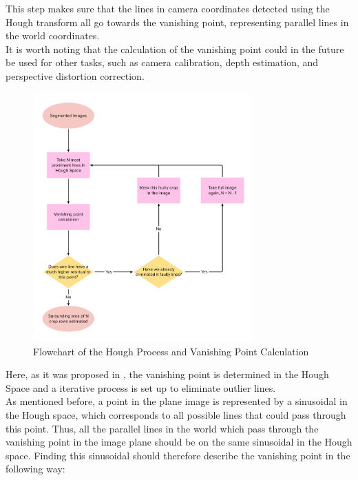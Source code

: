 This step makes sure that the lines in camera coordinates detected using the Hough transform all go towards the vanishing point, representing parallel lines in the world coordinates.\\

It is worth noting that the calculation of the vanishing point could in the future be used for other tasks, such as camera calibration, depth estimation, and perspective distortion correction. \\ 

\begin{figure}[H]
   \centering
   \includegraphics[width=0.75\textwidth]{Report/images/FlowCharts/VP calculation algorithm_2023-01-16_13-54-35.pdf}
   \caption{Flowchart of the Hough Process and Vanishing Point Calculation}
   \label{pics:VPCALC}
\end{figure}

Here, as it was proposed in \cite{CPCalcinHS}, the vanishing point is determined in the Hough Space and a iterative process is set up to eliminate outlier lines.  \\

As mentioned before, a point in the plane image is represented by a sinusoidal in the Hough space, which corresponds to all possible lines that could pass through this point. Thus, all the parallel lines in the world which pass through the vanishing point in the image plane should be on the same sinusoidal in the Hough space. Finding this sinusoidal should therefore describe the vanishing point in the following way:


